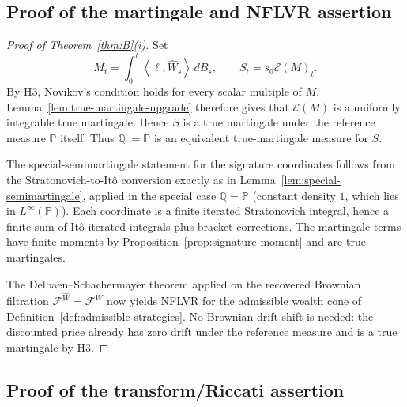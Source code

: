 \documentclass[11pt,oneside]{article}
\theoremstyle{plain}
\theoremstyle{definition}
\theoremstyle{remark}
\newcommand{\Q}{\mathbb{Q}}
\newcommand{\Pp}{\mathbb{P}}
\newcommand{\cW}{\widehat W}
\newcommand{\FWh}{\mathcal F^{\widehat W}}
\newcommand{\FW}{\mathcal F^W}
\newcommand{\inner}[2]{\left\langle #1,#2\right\rangle}
\begin{document}
\subsection{Proof of the martingale and NFLVR assertion}

\begin{proof}[Proof of Theorem~\ref{thm:B}(i)]
Set
\[
M_t=\int_0^t\inner{\ell}{\cW_s}\,dB_s,
\qquad
S_t=s_0\mathcal E(M)_t .
\]
By H3, Novikov's condition holds for every scalar multiple of $M$. Lemma~\ref{lem:true-martingale-upgrade} therefore gives that $\mathcal E(M)$ is a uniformly integrable true martingale. Hence $S$ is a true martingale under the reference measure $\Pp$ itself. Thus $\Q:=\Pp$ is an equivalent true-martingale measure for $S$.

The special-semimartingale statement for the signature coordinates follows from the Stratonovich-to-It\^o conversion exactly as in Lemma~\ref{lem:special-semimartingale}, applied in the special case $\Q=\Pp$ (constant density $1$, which lies in $L^\infty(\Pp)$). Each coordinate is a finite iterated Stratonovich integral, hence a finite sum of It\^o iterated integrals plus bracket corrections. The martingale terms have finite moments by Proposition~\ref{prop:signature-moment} and are true martingales.

The Delbaen--Schachermayer theorem applied on the recovered Brownian filtration $\FWh=\FW$ now yields NFLVR for the admissible wealth cone of Definition~\ref{def:admissible-strategies}. No Brownian drift shift is needed: the discounted price already has zero drift under the reference measure and is a true martingale by H3.
\end{proof}

\subsection{Proof of the transform/Riccati assertion}
\end{document}
